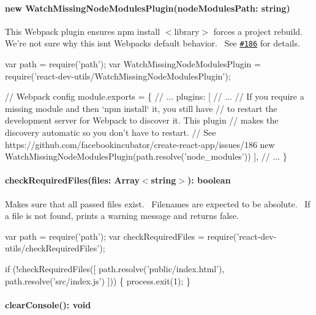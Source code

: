 \paragraph*{{\ttfamily new Watch\+Missing\+Node\+Modules\+Plugin(node\+Modules\+Path\+: string)}}

This Webpack plugin ensures {\ttfamily npm install $<$library$>$} forces a project rebuild.~\newline
 We’re not sure why this isn\textquotesingle{}t Webpack\textquotesingle{}s default behavior.~\newline
 See \href{https://github.com/facebookincubator/create-react-app/issues/186}{\tt \#186} for details.


\begin{DoxyCode}
var path = require('path');
var WatchMissingNodeModulesPlugin = require('react-dev-utils/WatchMissingNodeModulesPlugin');

// Webpack config
module.exports = \{
  // ...
  plugins: [
    // ...
    // If you require a missing module and then `npm install` it, you still have
    // to restart the development server for Webpack to discover it. This plugin
    // makes the discovery automatic so you don't have to restart.
    // See https://github.com/facebookincubator/create-react-app/issues/186
    new WatchMissingNodeModulesPlugin(path.resolve('node\_modules'))
  ],
  // ...
\}
\end{DoxyCode}


\paragraph*{{\ttfamily check\+Required\+Files(files\+: Array$<$string$>$)\+: boolean}}

Makes sure that all passed files exist.~\newline
 Filenames are expected to be absolute.~\newline
 If a file is not found, prints a warning message and returns {\ttfamily false}.


\begin{DoxyCode}
var path = require('path');
var checkRequiredFiles = require('react-dev-utils/checkRequiredFiles');

if (!checkRequiredFiles([
  path.resolve('public/index.html'),
  path.resolve('src/index.js')
])) \{
  process.exit(1);
\}
\end{DoxyCode}


\paragraph*{{\ttfamily clear\+Console()\+: void}}

